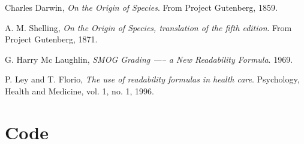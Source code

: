 \documentclass[a4paper]{article}
\begin{document}
\begin{thebibliography}{99}
  Charles Darwin,
  \emph{On the Origin of Species}.
  From Project Gutenberg,
  1859.

  A. M. Shelling,
  \emph{On the Origin of Species, translation of the fifth edition}.
  From Project Gutenberg,
  1871.

  G. Harry Mc Laughlin,
  \emph{SMOG Grading —– a New Readability Formula}.
  1969.
 
  P. Ley and T. Florio,
  \emph{The use of readability formulas in health care}.
  Psychology, Health and Medicine, vol. 1, no. 1,
  1996.

\end{thebibliography}

\newpage
\appendix
\section{Code}
\end{document}
